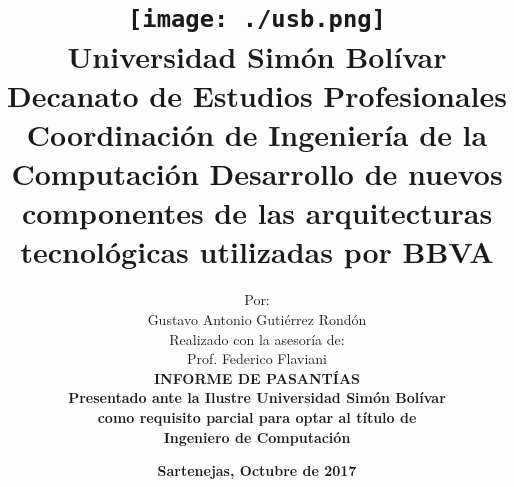 \begin{titlepage}
    \title{\vspace{-2cm} \texttt{[image: ./usb.png]} \\[.2cm]
        \large Universidad Simón Bolívar \\
        Decanato de Estudios Profesionales \\
        Coordinación de Ingeniería de la Computación
        \vfill \LARGE \bfseries Desarrollo de nuevos componentes de las arquitecturas
        tecnológicas utilizadas por BBVA \vfill}
    \author{Por: \\
        Gustavo Antonio Gutiérrez Rondón \\[1.2cm]
        Realizado con la asesoría de: \\
        Prof. Federico Flaviani \\[1.2cm]
        \bfseries{INFORME DE PASANTÍAS} \\
Presentado ante la Ilustre Universidad Simón Bolívar \\
como requisito parcial para optar al título de \\
Ingeniero de Computación}
    \date{\bfseries Sartenejas, Octubre de 2017}
\end{titlepage}

\maketitle